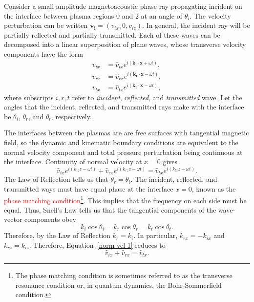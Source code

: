 \documentclass[12pt]{../style-files/ociamthesis}
\begin{document}
	Consider a small amplitude magnetoacoustic phase ray propagating incident on the interface between plasma regions 0 and 2 at an angle of $\theta_i$. The velocity perturbation can be written $\mathbf{v_i} = (v_{ix}, 0, v_{iz})$. In general, the incident ray will be partially reflected and partially transmitted. Each of these waves can be decomposed into a linear superposition of plane waves, whose transverse velocity components have the form
	\begin{align}
	v_{ix} &= \hat{v}_{ix} e^{i(\mathbf{k_i}\cdot \mathbf{x} + \omega t)}, \\
	v_{rx} &= \hat{v}_{rx} e^{i(\mathbf{k_r}\cdot \mathbf{x} - \omega t)}, \\
	v_{tx} &= \hat{v}_{tx} e^{i(\mathbf{k_t}\cdot \mathbf{x} - \omega t)},
	\label{fourier}
	\end{align}
	where subscripts $i, r, t$ refer to \textit{incident}, \textit{reflected}, and \textit{transmitted} wave. Let the angles that the incident, reflected, and transmitted rays make with the interface be $\theta_i$, $\theta_r$, and $\theta_t$, respectively.
	
	The interfaces between the plasmas are are free surfaces with tangential magnetic field, so the dynamic and kinematic boundary conditions are equivalent to the normal velocity component and total pressure perturbation being continuous at the interface. Continuity of normal velocity at $x = 0$ gives
	\begin{equation}
	\hat{v}_{ix}e^{i(k_{iz}z - \omega t)} + \hat{v}_{rx}e^{i(k_{rz}z - \omega t)} = \hat{v}_{tx}e^{i(k_{tz}z - \omega t)}. \label{norm vel 1}
	\end{equation}
	The Law of Reflection tells us that $\theta_r = \theta_i$. The incident, reflected, and transmitted ways must have equal phase at the interface $x = 0$, known as the \textcolor{red}{phase matching condition\footnote{The phase matching condition is sometimes referred to as the transverse resonance condition or, in quantum dynamics, the Bohr-Sommerfield condition.}}. This implies that the frequency on each side must be equal. Thus, Snell's Law tells us that the tangential components of the wave-vector components obey
	\begin{equation}
	k_i\cos{\theta_i} = k_r\cos{\theta_r} = k_t\cos{\theta_t}. \label{tang comp}
	\end{equation}
	Therefore, by the Law of Reflection $k_r = k_i$. In particular, $k_{rx} = -k_{ix}$ and $k_{rz} = k_{iz}$. Therefore, Equation~\eqref{norm vel 1} reduces to
	\begin{equation}
	\hat{v}_{ix} + \hat{v}_{rx} = \hat{v}_{tx}. \label{cont vel}
	\end{equation}
	
\end{document}
